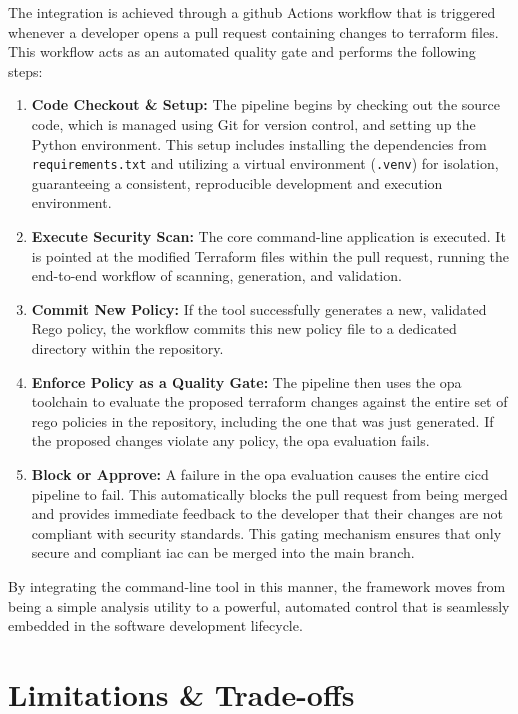The integration is achieved through a \gls{github} Actions workflow that is triggered whenever a developer opens a pull request containing changes to \gls{terraform} files. This workflow acts as an automated quality gate and performs the following steps:
\begin{enumerate}
    \item \textbf{Code Checkout \& Setup:} The pipeline begins by checking out the source code, which is managed using Git for version control, and setting up the Python environment. This setup includes installing the dependencies from \texttt{requirements.txt} and utilizing a virtual environment (\texttt{.venv}) for isolation, guaranteeing a consistent, reproducible development and execution environment.
    \item \textbf{Execute Security Scan:} The core command-line application is executed. It is pointed at the modified Terraform files within the pull request, running the end-to-end workflow of scanning, generation, and validation.
    \item \textbf{Commit New Policy:} If the tool successfully generates a new, validated Rego policy, the workflow commits this new policy file to a dedicated directory within the repository.
    \item \textbf{Enforce Policy as a Quality Gate:} The pipeline then uses the \gls{opa} toolchain to evaluate the proposed \gls{terraform} changes against the entire set of \gls{rego} policies in the repository, including the one that was just generated. If the proposed changes violate any policy, the \gls{opa} evaluation fails.
    \item \textbf{Block or Approve:} A failure in the \gls{opa} evaluation causes the entire \gls{cicd} pipeline to fail. This automatically blocks the pull request from being merged and provides immediate feedback to the developer that their changes are not compliant with security standards. This gating mechanism ensures that only secure and compliant \gls{iac} can be merged into the main branch.
\end{enumerate}
By integrating the command-line tool in this manner, the framework moves from being a simple analysis utility to a powerful, automated control that is seamlessly embedded in the software development lifecycle.

\section{Limitations \& Trade-offs}
\label{sec:limitations_tradeoffs}

